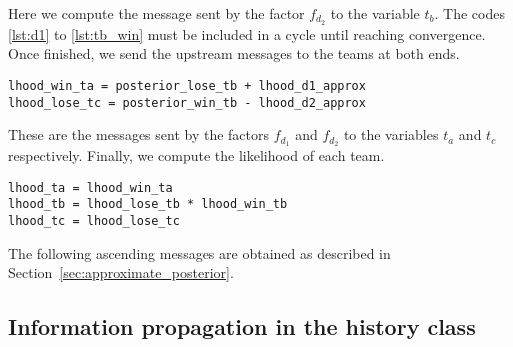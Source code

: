 \documentclass[article]{jss}
\begin{document}
%
Here we compute the message sent by the factor $f_{d_2}$ to the variable $t_b$. 
The codes \ref{lst:d1} to \ref{lst:tb_win} must be included in a cycle until reaching convergence. 
Once finished, we send the upstream messages to the teams at both ends. 
%
\begin{lstlisting}[captionpos=b,backgroundcolor=\color{all}, label=lst:multi_bordes, caption={Computing the messages received by $f_t$ factors of the winning and losing teams.},belowskip=0cm]
lhood_win_ta = posterior_lose_tb + lhood_d1_approx
lhood_lose_tc = posterior_win_tb - lhood_d2_approx
\end{lstlisting}
%
These are the messages sent by the factors $f_{d_1}$ and $f_{d_2}$ to the variables $t_a$ and $t_c$ respectively. 
Finally, we compute the likelihood of each team. 
%
\begin{lstlisting}[captionpos=b,backgroundcolor=\color{all}, label=lst:multi_ascendente, caption={Ascending messages sent by factors $f_t$ to the variables $t$.},belowskip=0cm]
lhood_ta = lhood_win_ta 
lhood_tb = lhood_lose_tb * lhood_win_tb
lhood_tc = lhood_lose_tc
\end{lstlisting}
%
The following ascending messages are obtained as described in Section~\ref{sec:approximate_posterior}. 

\subsection{Information propagation in the history class} \label{sec:throughTime}
\end{document}
